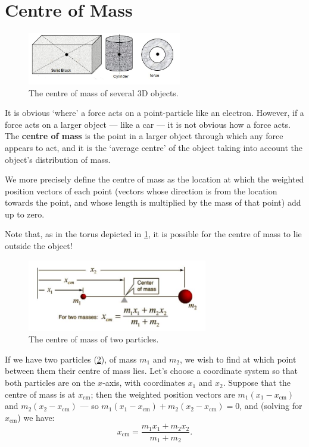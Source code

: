 \documentclass[a4paper]{amsbook}
\newcommand{\cm}{\text{cm}}
\theoremstyle{definition}
\numberwithin{exercise}{chapter}
\numberwithin{exercise}{chapter}
\begin{document}
\section{Centre of Mass}
\begin{figure}
  \centering
  \includegraphics[width=0.6\textwidth]{centreofmass2}
  \caption{The centre of mass of several 3D objects.}\label{fig:centreofmass2}
\end{figure}
It is obvious `where' a force acts on a point-particle like an electron. However, if a force acts on a larger object --- like a car --- it is
not obvious how a force acts. The \textbf{centre of mass} is the point in a larger object through which any force appears to act, and it is
the `average centre' of the object taking into account the object's distribution of mass.

We more precisely define the centre of mass as the location at which the weighted position vectors of each point (vectors whose direction is
from the location towards the point, and whose length is multiplied by the mass of that point) add up to zero.

Note that, as in the torus depicted in \cref{fig:centreofmass2}, it is possible for the centre of mass to lie outside the object!

\begin{figure}
  \centering
  \includegraphics[width=0.7\textwidth]{centreofmass}
  \caption{The centre of mass of two particles.}\label{fig:centreofmass}
\end{figure}

If we have two particles (\cref{fig:centreofmass}), of mass $ m_1 $ and $ m_2 $, we wish to find at which point between them their centre
of mass lies. Let's choose a coordinate system so that both particles are on the $ x$-axis, with coordinates $ x_1 $ and $ x_2 $. Suppose
that the centre of mass is at $ x_{\cm} $; then the weighted position vectors are $ m_1 (x_1 - x_\cm) $ and $ m_2 (x_2 - x_\cm) $ ---
so $ m_1 (x_1 - x_\cm) + m_2 (x_2 - x_\cm) = 0 $, and (solving for $ x_\cm $) we have:
\begin{equation}
  x_\cm = \frac{m_1 x_1 + m_2 x_2}{m_1 + m_2}.
\end{equation}
\end{document}
